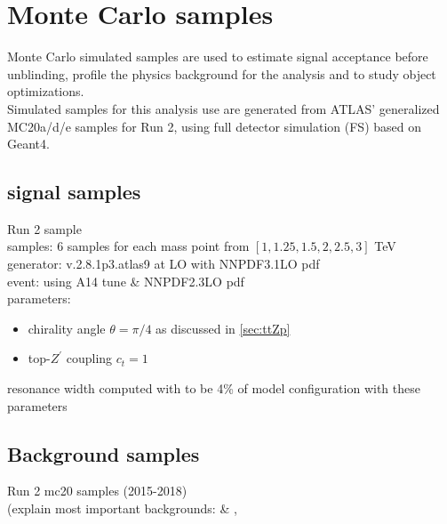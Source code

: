 \documentclass[../thesis.tex]{subfiles}
\begin{document}
\section{Monte Carlo samples}
\label{sec:montecarlo}
Monte Carlo simulated samples are used to estimate signal acceptance before unblinding, profile the physics background for the analysis and to study object optimizations.\\
Simulated samples for this analysis use are generated from ATLAS' generalized MC20a/d/e samples for Run 2, using full detector simulation (\acs{FS}) based on Geant4.

\subsection{\ttZp signal samples}
Run 2 \ttZp sample\\
samples: 6 samples for each mass point from $[1, 1.25, 1.5, 2, 2.5, 3]$ TeV\\
generator: \mgamc v.2.8.1p3.atlas9 at LO with \textsc{NNPDF3.1LO} pdf\\
event: \pythia[v.244p3.rangefix] using \textsc{A14} tune \& \textsc{NNPDF2.3LO} pdf\\
parameters:
\begin{itemize}
\item chirality angle $\theta=\pi/4$ as discussed in \autoref{sec:ttZp}
\item top-$Z^{'}$ coupling $c_t=1$
\end{itemize}
resonance width computed with \mgamc to be 4\% of model configuration with these parameters

\subsection{Background samples}
Run 2 mc20 samples (2015-2018)\\
(explain most important backgrounds: \tttt \& \ttV, \ttbar
\end{document}
